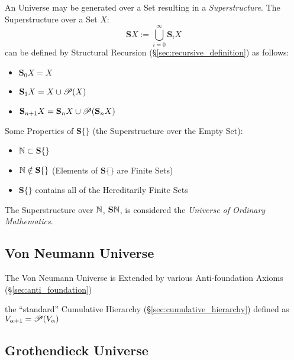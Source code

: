 An Universe may be generated over a Set resulting in a
\emph{Superstructure}. The Superstructure over a Set $X$:
\[
  \mathbf{S}X := \bigcup^{\infty}_{i=0}\mathbf{S}_i X
\]
can be defined by Structural Recursion
(\S\ref{sec:recursive_definition}) as follows:
\begin{itemize}

\item $\mathbf{S}_0 X = X$
\item $\mathbf{S}_1 X = X \cup \mathscr{P}(X)$
\item $\mathbf{S}_{n+1} X =
  \mathbf{S}_n X \cup \mathscr{P}(\mathbf{S}_n X)$

\end{itemize}
Some Properties of $\mathbf{S}\{\}$ (the Superstructure over the Empty
Set):
\begin{itemize}

\item $\mathbb{N} \subset \mathbf{S}\{\}$
\item $\mathbb{N} \notin \mathbf{S}\{\}$ (Elements of $\mathbf{S}\{\}$
  are Finite Sets)
\item $\mathbf{S}\{\}$ contains all of the Hereditarily Finite Sets

\end{itemize}

The Superstructure over $\mathbb{N}$, $\mathbf{S}\mathbb{N}$, is
considered the \emph{Universe of Ordinary Mathematics}.



\subsection{Von Neumann Universe}\label{sec:vonneumann_universe}

The Von Neumann Universe is Extended by various Anti-foundation Axioms
(\S\ref{sec:anti_foundation})

the ``standard'' Cumulative Hierarchy
(\S\ref{sec:cumulative_hierarchy}) defined as $V_{\alpha+1} =
\mathscr{P}(V_\alpha)$



\subsection{Grothendieck Universe}\label{sec:grothendieck_universe}

